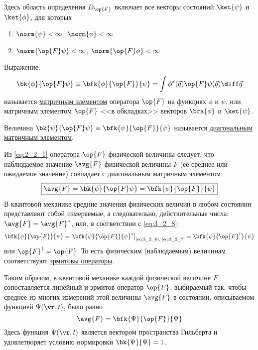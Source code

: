 Здесь область определения $D_{\op{F}}$ включает все векторы состояний $\ket{\psi}$ и $\ket{\phi}$, для которых
\begin{enumerate}
\item $\norm{\psi} < \infty$, $\norm{\phi} < \infty$
\item $\norm{\op{F} \psi} < \infty$, $\norm{\op{F} \phi} < \infty$
\end{enumerate}


\begin{defn}
Выражение:
$$
\bk{\phi}{\op{F}\psi} \equiv
  \bfk{\phi}{\op{F}}{\psi} =
  \int \phi^*(\vec{q})\op{F}\psi(\vec{q})\diff\vec{q}
$$
называется \underline{матричным элементом} оператора $\op{F}$ на функциях $\phi$ и $\psi$, или матричным элементом $\op{F}$ <<в обкладках>> векторов $\bra{\phi}$ и $\ket{\psi}$.

Величина $\bk{\psi}{\op{F}\psi} \equiv \bfk{\psi}{\op{F}}{\psi}$ называется \underline{диагональным матричным элементом}.
\end{defn}

Из \eqref{eq:2_2_1} оператора $\op{F}$ физической величины следует, что наблюдаемое значение $\avg{F}$ физической величины $F$ (её среднее или ожидаемое значение) совпадает с диагональным матричным элементом
\begin{equation}
\label{eq:3_2_8}
\boxed {
	\avg{F} = \bk{\psi}{\op{F}\psi} = \bfk{\psi}{\op{F}}{\psi}
}
\end{equation}%
%
В квантовой механике средние значения физических величин в любом состоянии представляют собой измеряемые, а следовательно, действительные числа: $\avg{F} = \avg{F}^*$, или, в соответствии с \eqref{eq:3_2_8}:
\begin{equation}
\label{eq:3_2_9}
\bfk{\psi}{\op{F}}{\psi}
  = \left .\bfk{\psi}{\op{F}}{\psi}^* \right|_{\text{\eqref{eq:3_2_6}, \eqref{eq:3_2_7}}}
  = \bfk{\psi}{\op{F}^\dag}{\psi}
\end{equation}%
%
или $\op{F}^\dag = \op{F}$. То есть физическим (наблюдаемым) величинам соответствуют \underline{эрмитовы операторы}.

Таким образом, в квантовой механике каждой физической величине $F$ сопоставляется линейный и эрмитов оператор $\op{F}$, выбираемый так, чтобы среднее из многих измерений этой величины $\avg{F}$ в состоянии, описываемом функцией $\Psi(\vr, t)$, было равно
$$
\avg{F} = \bfk{\Psi}{\op{F}}{\Psi}
$$
Здесь функция $\Psi(\vr, t)$ является вектором пространства Гильберта и удовлетворяет условию нормировки $\bk{\Psi}{\Psi} = 1$.

